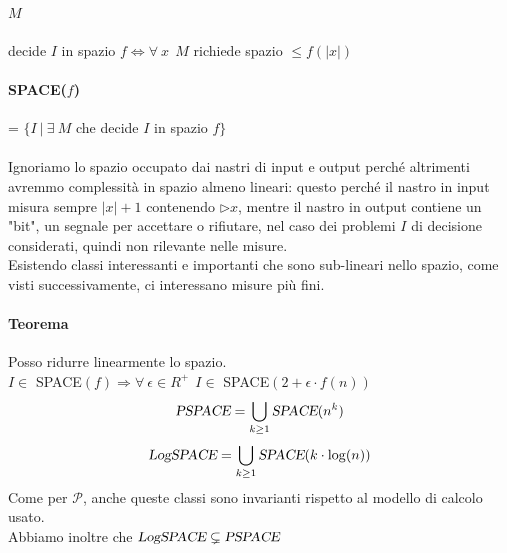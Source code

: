 \documentclass[10pt]{book}
\begin{document}
\paragraph{$M$} decide $I$ in spazio $f \Leftrightarrow \forall\: x\:\:M$ richiede spazio $\leq f(|x|)$
\paragraph{SPACE($f$)} = $\{I\: |\:\exists\: M$ che decide $I$ in spazio $f\}$
\paragraph{} Ignoriamo lo spazio occupato dai nastri di input e output perché altrimenti avremmo complessità in spazio almeno lineari: questo perché il nastro in input misura sempre $|x| + 1$ contenendo $\triangleright x$, mentre il nastro in output contiene un "bit", un segnale per accettare o rifiutare, nel caso dei problemi $I$ di decisione considerati, quindi non rilevante nelle misure.\\
Esistendo classi interessanti e importanti che sono sub-lineari nello spazio, come visti successivamente, ci interessano misure più fini.
\paragraph{Teorema} Posso ridurre linearmente lo spazio.\\
$I \in$ SPACE$(f) \Rightarrow \forall\:\epsilon\in R^+\:\: I \in$ SPACE$(2 + \epsilon\cdot f(n))$
$$\textsl{PSPACE} = \bigcup_{k\geq 1} \textsl{SPACE}(n^k)$$
$$\textsl{LogSPACE} = \bigcup_{k\geq 1} \textsl{SPACE}(k\cdot\log(n))$$
Come per $\mathscr{P}$, anche queste classi sono invarianti rispetto al modello di calcolo usato.\\
Abbiamo inoltre che $\textsl{LogSPACE}\subsetneq\textsl{PSPACE}$
\pagebreak
\end{document}
